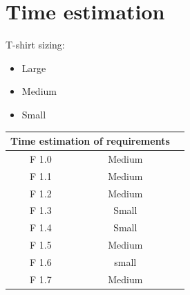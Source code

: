 \documentclass[a4paper, 12pt]{article}
\begin{document}
\section{Time estimation}
T-shirt sizing:
\begin{itemize}
\item Large
\item Medium
  \item Small
\end{itemize}
\begin{center}
\begin{tabular}{ |c|c|c| } 
  \hline
  \multicolumn{2}{|c|}{Time estimation of requirements} \\
  \hline
  F 1.0 & Medium \\
  \hline
  F 1.1 & Medium \\
  \hline
  F 1.2 & Medium \\
  \hline
  F 1.3 & Small \\
  \hline
  F 1.4 & Small \\
  \hline
  F 1.5 & Medium \\
  \hline
  F 1.6 & small \\
  \hline
  F 1.7 & Medium \\
 \hline
\end{tabular}
\end{center}
\end{document}
